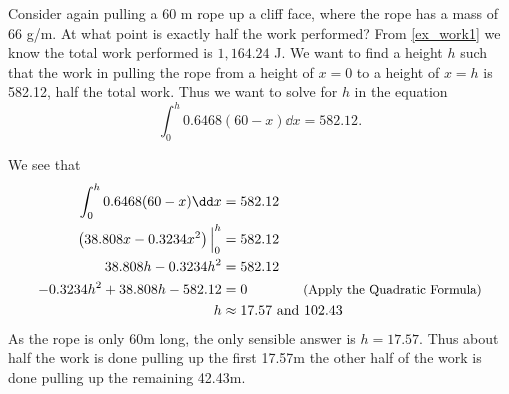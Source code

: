 \begin{example}\label{ex_work1_5}%
Consider again pulling a 60 m rope up a cliff face, where the rope has a mass of 66 g/m. At what point is exactly half the work performed?
\solution
From \autoref{ex_work1} we know the total work performed is $1,164.24$ J. We want to find a height $h$ such that the work in pulling the rope from a height of $x=0$ to a height of $x=h$ is 582.12, half the total work. Thus we want to solve for $h$ in the equation
\[\int_0^h 0.6468(60-x)\dd x = 582.12.\]

We see that
\begin{align*}
	\int_0^h 0.6468(60-x)\dd x &= 582.12 \\
	\left(38.808x-0.3234x^2\right)\Big|_0^h &=582.12 \\
	38.808h-0.3234h^2 &=582.12 \\
	-0.3234h^2+38.808h-582.12 &=0 \qquad\qquad\text{\small(Apply the Quadratic Formula)} \\
	h&\approx17.57 \ \text{and}\ 102.43
\end{align*}
As the rope is only 60m long, the only sensible answer is $h=17.57$. Thus about half the work is done pulling up the first 17.57m the other half of the work is done pulling up the remaining 42.43m.
\end{example}

